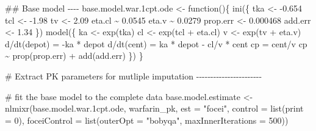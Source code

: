 \documentclass[
]{article}
\newenvironment{Shaded}{}{}
\newcommand{\AttributeTok}[1]{\textcolor[rgb]{0.84,0.23,0.29}{#1}}
\newcommand{\CommentTok}[1]{\textcolor[rgb]{0.42,0.45,0.49}{#1}}
\newcommand{\ControlFlowTok}[1]{\textcolor[rgb]{0.84,0.23,0.29}{#1}}
\newcommand{\DecValTok}[1]{\textcolor[rgb]{0.00,0.36,0.77}{#1}}
\newcommand{\DocumentationTok}[1]{\textcolor[rgb]{0.42,0.45,0.49}{#1}}
\newcommand{\FloatTok}[1]{\textcolor[rgb]{0.00,0.36,0.77}{#1}}
\newcommand{\FunctionTok}[1]{\textcolor[rgb]{0.44,0.26,0.76}{#1}}
\newcommand{\NormalTok}[1]{\textcolor[rgb]{0.14,0.16,0.18}{#1}}
\newcommand{\OtherTok}[1]{\textcolor[rgb]{0.44,0.26,0.76}{#1}}
\newcommand{\SpecialCharTok}[1]{\textcolor[rgb]{0.00,0.36,0.77}{#1}}
\newcommand{\StringTok}[1]{\textcolor[rgb]{0.01,0.18,0.38}{#1}}
\begin{document}
\begin{Shaded}
\begin{Highlighting}[]
\DocumentationTok{\#\# Base model {-}{-}{-}{-}}
\NormalTok{base.model.war}\FloatTok{.1}\NormalTok{cpt.ode }\OtherTok{\textless{}{-}} \ControlFlowTok{function}\NormalTok{()\{}
  \FunctionTok{ini}\NormalTok{(\{}
\NormalTok{    tka }\OtherTok{\textless{}{-}} \SpecialCharTok{{-}}\FloatTok{0.654}
\NormalTok{    tcl }\OtherTok{\textless{}{-}} \SpecialCharTok{{-}}\FloatTok{1.98}
\NormalTok{    tv }\OtherTok{\textless{}{-}} \FloatTok{2.09}
\NormalTok{    eta.cl }\SpecialCharTok{\textasciitilde{}} \FloatTok{0.0545}
\NormalTok{    eta.v }\SpecialCharTok{\textasciitilde{}} \FloatTok{0.0279}
\NormalTok{    prop.err }\OtherTok{\textless{}{-}} \FloatTok{0.000468}
\NormalTok{    add.err }\OtherTok{\textless{}{-}} \FloatTok{1.34}
\NormalTok{  \})}
  \FunctionTok{model}\NormalTok{(\{}
\NormalTok{    ka }\OtherTok{\textless{}{-}} \FunctionTok{exp}\NormalTok{(tka)}
\NormalTok{    cl }\OtherTok{\textless{}{-}} \FunctionTok{exp}\NormalTok{(tcl }\SpecialCharTok{+}\NormalTok{ eta.cl)}
\NormalTok{    v }\OtherTok{\textless{}{-}} \FunctionTok{exp}\NormalTok{(tv }\SpecialCharTok{+}\NormalTok{ eta.v)}
\NormalTok{    d}\SpecialCharTok{/}\FunctionTok{dt}\NormalTok{(depot) }\OtherTok{=} \SpecialCharTok{{-}}\NormalTok{ka }\SpecialCharTok{*}\NormalTok{ depot}
\NormalTok{    d}\SpecialCharTok{/}\FunctionTok{dt}\NormalTok{(cent) }\OtherTok{=}\NormalTok{ ka }\SpecialCharTok{*}\NormalTok{ depot }\SpecialCharTok{{-}}\NormalTok{ cl}\SpecialCharTok{/}\NormalTok{v }\SpecialCharTok{*}\NormalTok{ cent}
\NormalTok{    cp }\OtherTok{=}\NormalTok{ cent}\SpecialCharTok{/}\NormalTok{v}
\NormalTok{    cp }\SpecialCharTok{\textasciitilde{}} \FunctionTok{prop}\NormalTok{(prop.err) }\SpecialCharTok{+} \FunctionTok{add}\NormalTok{(add.err)}
\NormalTok{  \})}
\NormalTok{\}}

\CommentTok{\# Extract PK parameters for mutliple imputation {-}{-}{-}{-}{-}{-}{-}{-}{-}{-}{-}{-}{-}{-}{-}{-}{-}{-}{-}{-}{-}{-}{-}}

\CommentTok{\# fit the base model to the complete data}
\NormalTok{base.model.estimate }\OtherTok{\textless{}{-}} \FunctionTok{nlmixr}\NormalTok{(base.model.war}\FloatTok{.1}\NormalTok{cpt.ode,}
\NormalTok{                              warfarin\_pk, }
                              \AttributeTok{est =} \StringTok{"focei"}\NormalTok{,}
                              \AttributeTok{control =} \FunctionTok{list}\NormalTok{(}\AttributeTok{print =} \DecValTok{0}\NormalTok{),}
                              \AttributeTok{foceiControl =} \FunctionTok{list}\NormalTok{(}\AttributeTok{outerOpt =} \StringTok{"bobyqa"}\NormalTok{,}
                                                  \AttributeTok{maxInnerIterations =} \DecValTok{500}\NormalTok{))}


\end{Highlighting}
\end{Shaded}
\end{document}
